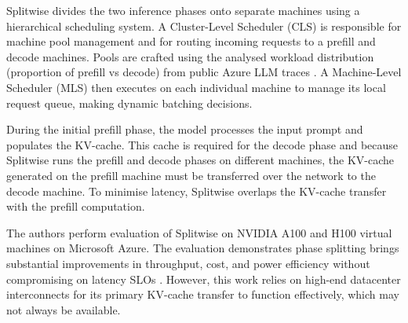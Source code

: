 Splitwise divides the two inference phases onto separate machines using a hierarchical scheduling system. 
A Cluster-Level Scheduler (CLS) is responsible for machine pool management and for routing incoming requests to a prefill and decode machines.
Pools are crafted using the analysed workload distribution (proportion of prefill vs decode) from public Azure LLM traces \autocite{patelSplitwiseEfficientGenerative2024}.
A Machine-Level Scheduler (MLS) then executes on each individual machine to manage its local request queue, making dynamic batching decisions.

During the initial prefill phase, the model processes the input prompt and populates the KV-cache.
This cache is required for the decode phase and because Splitwise runs the prefill and decode phases on different machines, the KV-cache generated on the prefill machine must be transferred over the network to the decode machine.
To minimise latency, Splitwise overlaps the KV-cache transfer with the prefill computation.



The authors perform evaluation of Splitwise on NVIDIA A100 and H100 virtual machines on Microsoft Azure. %
The evaluation demonstrates phase splitting brings substantial improvements in throughput, cost, and power efficiency without compromising on latency SLOs \autocite{patelSplitwiseEfficientGenerative2024}.
However, this work relies on high-end datacenter interconnects for its primary KV-cache transfer to function effectively, which may not always be available.




